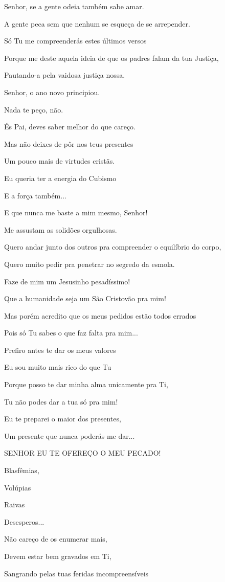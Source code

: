 Senhor, se a gente odeia também sabe amar.

A gente peca sem que nenhum se esqueça de se arrepender.

Só Tu me compreenderás estes últimos versos

Porque me deste aquela ideia de que os padres falam da tua Justiça,

Pautando-a pela vaidosa justiça nossa.

Senhor, o ano novo principiou.

Nada te peço, não.

És Pai, deves saber melhor do que careço.

Mas não deixes de pôr nos teus presentes

Um pouco mais de virtudes cristãs.

Eu queria ter a energia do Cubismo

E a força também...

E que nunca me baste a mim mesmo, Senhor!

Me assustam as solidões orgulhosas.

Quero andar junto dos outros pra compreender o equilíbrio do corpo,

Quero muito pedir pra penetrar no segredo da esmola.

Faze de mim um Jesusinho pesadíssimo!

Que a humanidade seja um São Cristovão pra mim!

Mas porém acredito que os meus pedidos estão todos errados

Pois só Tu sabes o que faz falta pra mim...

Prefiro antes te dar os meus valores

Eu sou muito mais rico do que Tu

Porque posso te dar minha alma unicamente pra Ti,

Tu não podes dar a tua só pra mim!

Eu te preparei o maior dos presentes,

Um presente que nunca poderás me dar...

SENHOR EU TE OFEREÇO O MEU PECADO!

Blasfêmias,

Volúpias

Raivas

Desesperos...

Não careço de os enumerar mais,

Devem estar bem gravados em Ti,

Sangrando pelas tuas feridas incompreensíveis

